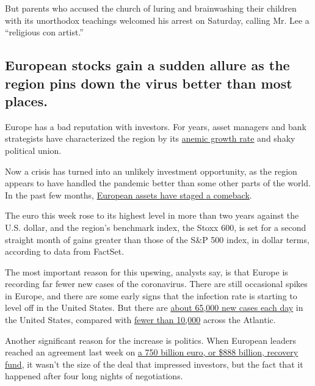 But parents who accused the church of luring and brainwashing their
children with its unorthodox teachings welcomed his arrest on Saturday,
calling Mr. Lee a ``religious con artist.''

\hypertarget{european-stocks-gain-a-sudden-allure-as-the-region-pins-down-the-virus-better-than-most-places}{%
\subsection{European stocks gain a sudden allure as the region pins down
the virus better than most
places.}\label{european-stocks-gain-a-sudden-allure-as-the-region-pins-down-the-virus-better-than-most-places}}

Europe has a bad reputation with investors. For years, asset managers
and bank strategists have characterized the region by its
\href{https://qz.com/1544961/the-euro-zone-economy-is-back-on-familiar-ground-slow-grinding-growth/}{anemic
growth rate} and shaky political union.

Now a crisis has turned into an unlikely investment opportunity, as the
region appears to have handled the pandemic better than some other parts
of the world. In the past few months,
\href{https://www.nytimes3xbfgragh.onion/2020/07/30/business/europes-markets-are-having-a-moment.html}{European
assets have staged a comeback}.

The euro this week rose to its highest level in more than two years
against the U.S. dollar, and the region's benchmark index, the Stoxx
600, is set for a second straight month of gains greater than those of
the S\&P 500 index, in dollar terms, according to data from FactSet.

The most important reason for this upswing, analysts say, is that Europe
is recording far fewer new cases of the coronavirus. There are still
occasional spikes in Europe, and there are some early signs that the
infection rate is starting to level off in the United States. But there
are
\href{https://www.nytimes3xbfgragh.onion/interactive/2020/us/coronavirus-us-cases.html?campaign_id=154\&emc=edit_cb_20200728\&instance_id=20725\&nl=coronavirus-briefing\&regi_id=137662381\&segment_id=34584\&te=1\&user_id=72eee90673e6857ae5a6e83e1981a59a}{about
65,000 new cases each day} in the United States, compared with
\href{https://www.ecdc.europa.eu/en/cases-2019-ncov-eueea}{fewer than
10,000} across the Atlantic.

Another significant reason for the increase is politics. When European
leaders reached an agreement last week on
\href{https://www.nytimes3xbfgragh.onion/2020/07/20/world/europe/eu-stimulus-coronavirus.html}{a
750 billion euro, or \$888 billion, recovery fund}, it wasn't the size
of the deal that impressed investors, but the fact that it happened
after four long nights of negotiations.


